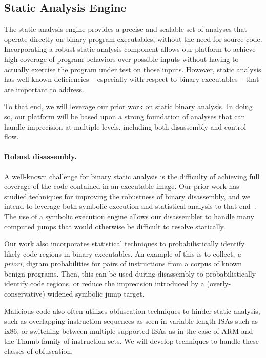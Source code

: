 \documentclass[letterpaper,twoside,11pt,headings=small]{scrartcl}
\begin{document}
\subsection{Static Analysis Engine}

The static analysis engine provides a precise and scalable set of analyses
that operate directly on binary program executables, without the need for
source code.  Incorporating a robust static analysis component allows our
platform to achieve high coverage of program behaviors over possible inputs
without having to actually exercise the program under test on those inputs.
However, static analysis has well-known deficiencies -- especially with
respect to binary executables -- that are important to address.

To that end, we will leverage our prior work on static binary analysis. In
doing so, our platform will be based upon a strong foundation of analyses that
can handle imprecision at multiple levels, including both disassembly and
control flow.

\paragraph{Robust disassembly.} A well-known challenge for binary static
analysis is the difficulty of achieving full coverage of the code contained in
an executable image. Our prior work has studied techniques for improving the
robustness of binary disassembly, and we intend to leverage both symbolic
execution and statistical analysis to that end~\cite{kruegel:sec2004:disasm}.
The use of a symbolic execution engine allows our disassembler to handle many
computed jumps that would otherwise be difficult to resolve statically.

Our work also incorporates statistical techniques to probabilistically
identify likely code regions in binary executables.  An example of this is to
collect, \emph{a priori}, digram probabilities for pairs of instructions from
a corpus of known benign programs.  Then, this can be used during disassembly
to probabilistically identify code regions, or reduce the imprecision
introduced by a (overly-conservative) widened symbolic jump target.

Malicious code also often utilizes obfuscation techniques to hinder static
analysis, such as overlapping instruction sequences as seen in variable length
ISAs such as ix86, or switching between multiple supported ISAs as in the case
of ARM and the Thumb family of instruction sets.  We will develop techniques
to handle these classes of obfuscation.
\end{document}
